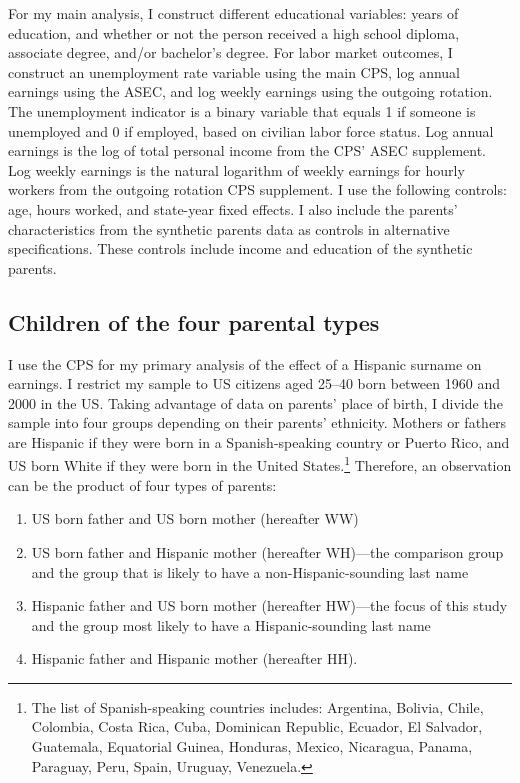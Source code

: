 For my main analysis, I construct different educational variables: years of education, and whether or not the person received a high school diploma, associate degree, and/or bachelor’s degree. For labor market outcomes, I construct an unemployment rate variable using the main CPS, log annual earnings using the ASEC, and log weekly earnings using the outgoing rotation. The unemployment indicator is a binary variable that equals 1 if someone is unemployed and 0 if employed, based on civilian labor force status. Log annual earnings is the log of total personal income from the CPS’ ASEC supplement. Log weekly earnings is the natural logarithm of weekly earnings for hourly workers from the outgoing rotation CPS supplement. I use the following controls: age, hours worked, and state-year fixed effects. I also include the parents’ characteristics from the synthetic parents data as controls in alternative specifications. These controls include income and education of the synthetic parents.

\subsection{Children of the four parental types}

I use the CPS for my primary analysis of the effect of a Hispanic surname on earnings. I restrict my sample to US citizens  aged 25–40 born between 1960 and 2000 in the US. Taking advantage of data on parents’ place of birth, I divide the sample into four groups depending on their parents’ ethnicity. Mothers or fathers are Hispanic if they were born in a Spanish-speaking country or Puerto Rico, and US born White if they were born in the United States.\footnote{The list of Spanish-speaking countries includes: Argentina, Bolivia, Chile, Colombia, Costa Rica, Cuba, Dominican Republic, Ecuador, El Salvador, Guatemala, Equatorial Guinea, Honduras, Mexico, Nicaragua, Panama, Paraguay, Peru, Spain, Uruguay, Venezuela.} Therefore, an observation can be the product of four types of parents:
\begin{enumerate}
\item US born father and US born mother (hereafter WW) 
\item US born father and Hispanic mother (hereafter WH)---the comparison group and the group that is likely to have a non-Hispanic-sounding last name
\item Hispanic father and US born mother (hereafter HW)---the focus of this study and the group most likely to have a Hispanic-sounding last name
\item Hispanic father and Hispanic mother (hereafter HH).
\end{enumerate}

